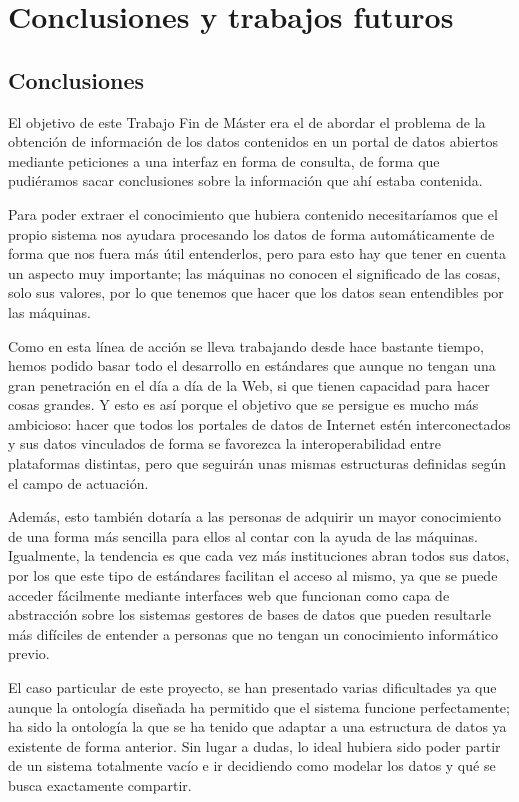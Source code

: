 \chapter{Conclusiones y trabajos futuros}

\section{Conclusiones}

El objetivo de este {\sf Trabajo Fin de Máster} era el de abordar el problema de la obtención de información de los datos contenidos en un portal de datos abiertos mediante peticiones a una interfaz en forma de consulta, de forma que pudiéramos sacar conclusiones sobre la información que ahí estaba contenida.
\bigskip

Para poder extraer el conocimiento que hubiera contenido necesitaríamos que el propio sistema nos ayudara procesando los datos de forma automáticamente de forma que nos fuera más útil entenderlos, pero para esto hay que tener en cuenta un aspecto muy importante; las máquinas no conocen el significado de las cosas, solo sus valores, por lo que tenemos que hacer que los datos sean entendibles por las máquinas.
\bigskip

Como en esta línea de acción se lleva trabajando desde hace bastante tiempo, hemos podido basar todo el desarrollo en estándares que aunque no tengan una gran penetración en el día a día de la {\sf Web}, si que tienen capacidad para hacer cosas grandes. Y esto es así porque el objetivo que se persigue es mucho más ambicioso: hacer que todos los portales de datos de Internet estén interconectados y sus datos vinculados de forma se favorezca la interoperabilidad entre plataformas distintas, pero que seguirán unas mismas estructuras definidas según el campo de actuación.

\newpage
Además, esto también dotaría a las personas de adquirir un mayor conocimiento de una forma más sencilla para ellos al contar con la ayuda de las máquinas. Igualmente, la tendencia es que cada vez más instituciones abran todos sus datos, por los que este tipo de estándares facilitan el acceso al mismo, ya que se puede acceder fácilmente mediante interfaces web que funcionan como capa de abstracción sobre los sistemas gestores de bases de datos que pueden resultarle más difíciles de entender a personas que no tengan un conocimiento informático previo.

\bigskip
El caso particular de este proyecto, se han presentado varias dificultades ya que aunque la ontología diseñada ha permitido que el sistema funcione perfectamente; ha sido la ontología la que se ha tenido que adaptar a una estructura de datos ya existente de forma anterior. Sin lugar a dudas, lo ideal hubiera sido poder partir de un sistema totalmente vacío e ir decidiendo como modelar los datos y qué se busca exactamente compartir.

